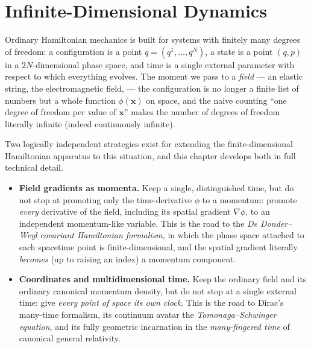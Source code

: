 \chapter{Infinite-Dimensional Dynamics}
\label{id}
\show\pdv
\show\fdv
\newcommand{\rd}{\mathrm{d}}
\newcommand{\Lag}{\mathcal{L}}
\newcommand{\Ham}{\mathcal{H}}

Ordinary Hamiltonian mechanics is built for systems with finitely many degrees
of freedom: a configuration is a point $q=(q^1,\dots,q^N)$, a state is a point
$(q,p)$ in a $2N$-dimensional phase space, and time is a single external
parameter with respect to which everything evolves. The moment we pass to a
\emph{field} --- an elastic string, the electromagnetic field, 
--- the configuration is no longer a finite list of numbers but a whole
function $\phi(\mathbf{x})$ on space, and the naive counting ``one degree of
freedom per value of $\mathbf{x}$'' makes the number of degrees of freedom
literally infinite (indeed continuously infinite).

Two logically independent strategies exist for extending the finite-dimensional
Hamiltonian apparatus to this situation, and this chapter develops both in full
technical detail.

\begin{itemize}
\item[(I)] \textbf{Field gradients as momenta.} Keep a single, distinguished
    time, but do not stop at promoting only the time-derivative $\dot\phi$ to a
        momentum: promote \emph{every} derivative of the field, including its
        spatial gradient $\nabla\phi$, to an independent momentum-like
        variable. This is the road to the \emph{De Donder--Weyl covariant
        Hamiltonian formalism}, in which the phase space attached to each
        spacetime point is finite-dimensional, and the spatial gradient
        literally \emph{becomes} (up to raising an index) a momentum component.
\item[(II)] \textbf{Coordinates and multidimensional time.} Keep the ordinary
    field and its ordinary canonical momentum density, but do not stop at a
        single external time: give \emph{every point of space its own clock}.
        This is the road to Dirac's many-time formalism, its continuum avatar
        the \emph{Tomonaga--Schwinger equation}, and its fully geometric
        incarnation in the \emph{many-fingered time} of canonical general
        relativity.
\end{itemize}

